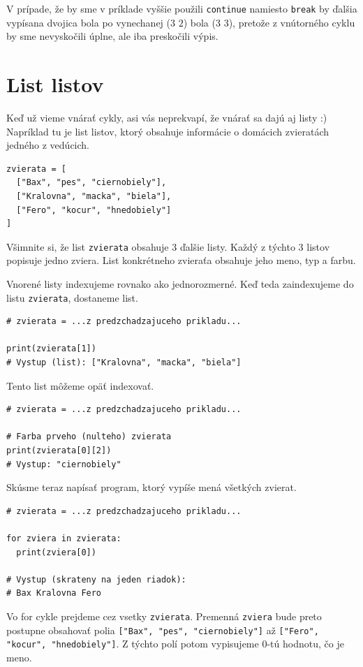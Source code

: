 \documentclass{article}
\begin{document}
V prípade, že by sme v príklade vyššie použili \texttt{continue} namiesto \texttt{break} by ďalšia vypísana dvojica bola po vynechanej ($3$ $2$) bola
($3$ $3$), pretože z vnútorného cyklu by sme nevyskočili úplne, ale iba preskočili výpis.

\section{List listov}
Keď už vieme vnárať cykly, asi vás neprekvapí, že vnárať sa dajú aj listy :)
Napríklad tu je list listov, ktorý obsahuje informácie o domácich zvieratách jedného z vedúcich.
\begin{lstlisting}
zvierata = [
  ["Bax", "pes", "ciernobiely"],
  ["Kralovna", "macka", "biela"],
  ["Fero", "kocur", "hnedobiely"]
]
\end{lstlisting}
Všimnite si, že list \texttt{zvierata} obsahuje $3$ ďalšie listy. Každý z týchto $3$ listov popisuje jedno zviera. List konkrétneho zvieraťa obsahuje jeho meno, typ a farbu.

Vnorené listy indexujeme rovnako ako jednorozmerné. Keď teda zaindexujeme do listu \texttt{zvierata}, dostaneme list.
\begin{lstlisting}
# zvierata = ...z predzchadzajuceho prikladu...

print(zvierata[1])
# Vystup (list): ["Kralovna", "macka", "biela"]
\end{lstlisting}
Tento list môžeme opäť indexovať.
\begin{lstlisting}
# zvierata = ...z predzchadzajuceho prikladu...

# Farba prveho (nulteho) zvierata
print(zvierata[0][2])
# Vystup: "ciernobiely"
\end{lstlisting}
Skúsme teraz napísať program, ktorý vypíše mená všetkých zvierat.
\begin{lstlisting}
# zvierata = ...z predzchadzajuceho prikladu...

for zviera in zvierata:
  print(zviera[0])

# Vystup (skrateny na jeden riadok):
# Bax Kralovna Fero
\end{lstlisting}
Vo for cykle prejdeme cez vsetky \texttt{zvierata}. Premenná \texttt{zviera} bude preto postupne obsahovať polia \texttt{["Bax", "pes", "ciernobiely"]} až
\texttt{["Fero", "kocur", "hnedobiely"]}. Z týchto polí potom vypisujeme $0$-tú hodnotu, čo je meno.
\end{document}
